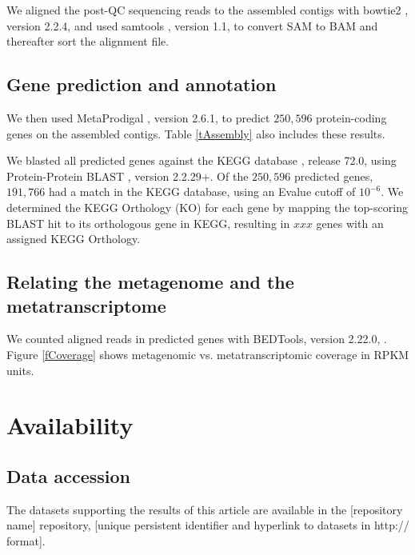 \documentclass{bmcart}
\begin{document}
We aligned the post-QC sequencing reads to the assembled contigs with bowtie2 \cite{Bowtie2}, version 2.2.4, and used samtools \cite{Samtools}, version 1.1, to convert SAM to BAM and thereafter sort the alignment file. 

\subsection*{Gene prediction and annotation}
We then used MetaProdigal \cite{MetaProdigal}, version 2.6.1, to predict $250,596$ protein-coding genes on the assembled contigs. Table \ref{tAssembly} also includes these results.

We blasted all predicted genes against the KEGG database \cite{KeggDB}, release 72.0, using Protein-Protein BLAST \cite{BlastPlus}, version 2.2.29+. 
Of the $250,596$ predicted genes, $191,766$ had a match in the KEGG database, using an Evalue cutoff of $10^{-6}$.
We determined the KEGG Orthology (KO) for each gene by mapping the top-scoring BLAST hit to its orthologous gene in KEGG, resulting in $xxx$ genes with an assigned KEGG Orthology.

\subsection*{Relating the metagenome and the metatranscriptome}
We counted aligned reads in predicted genes with BEDTools, version 2.22.0, \cite{BEDTools}.
Figure \ref{fCoverage} shows metagenomic vs. metatranscriptomic coverage in RPKM units.

\section*{Availability}
\subsection*{Data accession}
The datasets supporting the results of this article are available in the [repository name] repository, [unique persistent identifier and hyperlink to datasets in http:// format].
\end{document}
